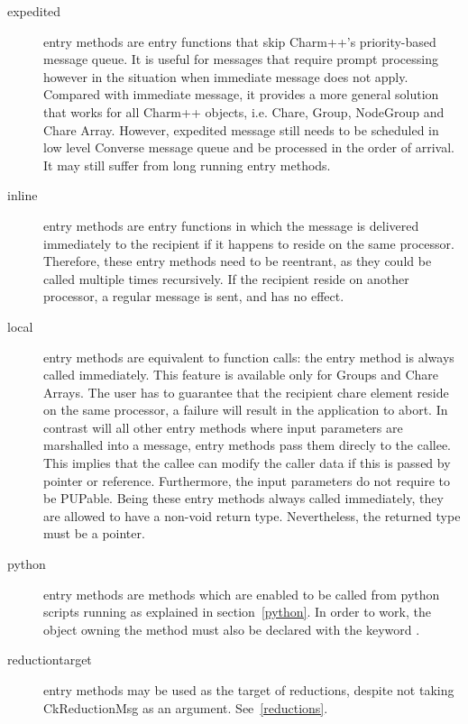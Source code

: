 \begin{description}
\item[expedited] entry methods are entry functions 
that skip Charm++'s priority-based message queue. It is useful for messages that
require prompt processing however in the situation when immediate message does
not apply. Compared with immediate message, it provides a more general solution
that works for all Charm++ objects, i.e. Chare, Group, NodeGroup and Chare
Array. However, expedited message still needs to be scheduled in low level
Converse message queue and be processed in the order of arrival. It may still
suffer from long running entry methods.

\item[inline] entry methods are entry functions in which the
message is delivered immediately to the recipient if it happens to reside on the
same processor. Therefore, these entry methods need to be reentrant, as they
could be called multiple times recursively. If the recipient reside on another
processor, a regular message is sent, and  has no effect.

\item[local] entry methods are equivalent to function calls: the
entry method is always called immediately. This feature is available only for
Groups and Chare Arrays. The user has to guarantee that the recipient chare
element reside on the same processor, a failure will result in the application
to abort. In contrast will all other entry methods where input parameters are
marshalled into a message,  entry methods pass them direcly to the
callee. This implies that the callee can modify the caller data if this is
passed by pointer or reference. Furthermore, the input parameters do not require
to be PUPable. Being these entry methods always called immediately, they are
allowed to have a non-void return type. Nevertheless, the returned type must be
a pointer.

\item[python] entry methods are methods which are enabled to be
called from python scripts running as explained in section~\ref{python}. In
order to work, the object owning the method must also be declared with the
keyword .

\item[reductiontarget] entry methods may be used as the
target of reductions, despite not taking CkReductionMsg as an argument.
See~\ref{reductions}.

\end{description}
